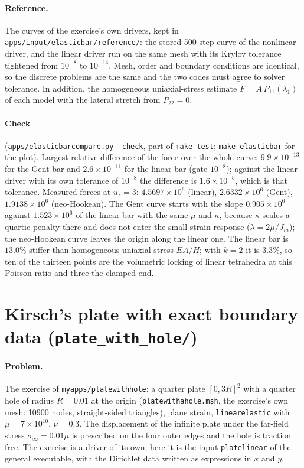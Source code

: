 \documentclass[11pt]{article}
\DeclareRobustCommand{\code}[1]{{\def\_{\textunderscore\allowbreak}\texttt{#1}}}
\DeclareRobustCommand{\file}[1]{{\def\_{\textunderscore\allowbreak}\texttt{#1}}}
\begin{document}
\paragraph{Reference.}
The curves of the exercise's own drivers, kept in
\file{apps/input/elastic\_bar/reference/}: the stored 500-step curve of the
nonlinear driver, and the linear driver run on the same mesh with its Krylov
tolerance tightened from $10^{-8}$ to $10^{-14}$.  Mesh, order and boundary
conditions are identical, so the discrete problems are the same and the two
codes must agree to solver tolerance.  In addition, the homogeneous
uniaxial-stress estimate $F = A\,P_{11}(\lambda_1)$ of each model with the
lateral stretch from $P_{22} = 0$.

\paragraph{Check} (\file{apps/elastic\_bar\_compare.py --check}, part of
\code{make test}; \code{make elastic\_bar} for the plot).
Largest relative difference of the force over the whole curve:
$9.9\times10^{-13}$ for the Gent bar and $2.6\times10^{-11}$ for the linear
bar (gate $10^{-8}$); against the linear driver with its own tolerance of
$10^{-8}$ the difference is $1.6\times10^{-5}$, which is that tolerance.
Measured forces at $u_z = 3$: $4.5697\times10^6$ (linear),
$2.6332\times10^6$ (Gent), $1.9138\times10^6$ (neo-Hookean).  The Gent curve
starts with the slope $0.905\times10^6$ against $1.523\times10^6$ of the
linear bar with the same $\mu$ and $\kappa$, because $\kappa$ scales a
quartic penalty there and does not enter the small-strain response
($\lambda = 2\mu/J_m$); the neo-Hookean curve leaves the origin along the
linear one.  The linear bar is $13.0\%$ stiffer than homogeneous uniaxial
stress $EA/H$; with $k = 2$ it is $3.3\%$, so ten of the thirteen points are
the volumetric locking of linear tetrahedra at this Poisson ratio and three
the clamped end.

\section{Kirsch's plate with exact boundary data (\texttt{plate\_with\_hole/})}
\label{sec:platewithhole}

\paragraph{Problem.}
The exercise of \file{myapps/plate\_with\_hole}: a quarter plate $[0, 3R]^2$
with a quarter hole of radius $R = 0.01$ at the origin
(\file{plate\_with\_a\_hole.msh}, the exercise's own mesh: 10900 nodes,
straight-sided triangles), plane strain, \code{linear\_elastic} with
$\mu = 7\times10^{10}$, $\nu = 0.3$.  The displacement of the infinite plate
under the far-field stress $\sigma_\infty = 0.01\mu$ is prescribed on the four
outer edges and the hole is traction free.  The exercise is a driver of its
own; here it is the input \file{plate\_linear} of the general executable,
with the Dirichlet data written as expressions in $x$ and $y$.
\end{document}
